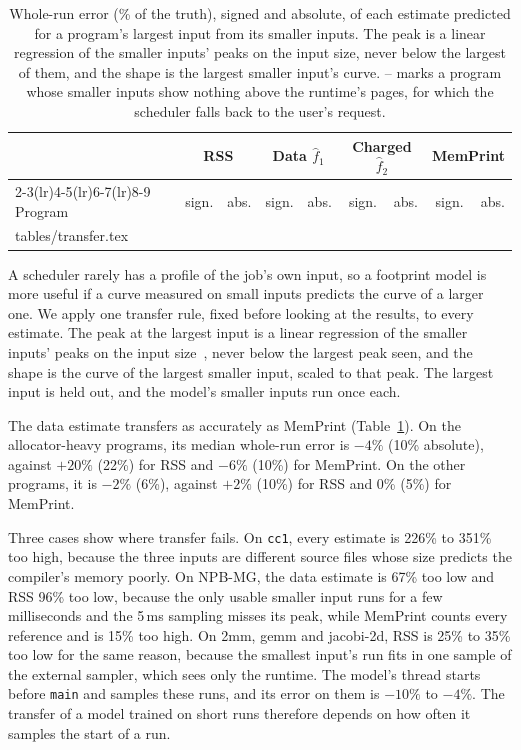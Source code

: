 \documentclass[11pt]{article}
\makeatletter
\newcommand{\memprint}{MemPrint}
\newcommand{\tabref}[1]{Table~\ref{#1}}
\newcommand{\tabinput}[1]{\@@input #1 }   %
\makeatother
\begin{document}
\begin{table}[t]
\centering
\small
\caption{Whole-run error (\% of the truth), signed and absolute, of each estimate predicted for a program's largest
input from its smaller inputs. The peak is a linear regression of the smaller inputs' peaks on the input size, never
below the largest of them, and the shape is the largest smaller input's curve. -- marks a program whose smaller inputs
show nothing above the runtime's pages, for which the scheduler falls back to the user's request.}
\label{tab:transfer}
\setlength{\tabcolsep}{5pt}
\begin{tabular}{lrrrrrrrr}
\toprule
 & \multicolumn{2}{c}{RSS} & \multicolumn{2}{c}{Data $\hat f_1$} & \multicolumn{2}{c}{Charged $\hat f_2$} & \multicolumn{2}{c}{\memprint{}} \\
\cmidrule(lr){2-3}\cmidrule(lr){4-5}\cmidrule(lr){6-7}\cmidrule(lr){8-9}
Program & sign. & abs. & sign. & abs. & sign. & abs. & sign. & abs. \\
\midrule
\tabinput{tables/transfer.tex}
\bottomrule
\end{tabular}
\end{table}

A scheduler rarely has a profile of the job's own input, so a footprint model is more useful if a curve measured on
small inputs predicts the curve of a larger one. We apply one transfer rule, fixed before looking at the results, to
every estimate. The peak at the largest input is a linear regression of the smaller inputs' peaks on the input
size~\cite{KSplus2024}, never below the largest peak seen, and the shape is the curve of the largest smaller input,
scaled to that peak. The largest input is held out, and the model's smaller inputs run once each.

The data estimate transfers as accurately as \memprint{} (\tabref{tab:transfer}). On the allocator-heavy programs, its
median whole-run error is $-4\%$ (10\% absolute), against $+20\%$ (22\%) for RSS and $-6\%$ (10\%) for \memprint{}. On
the other programs, it is $-2\%$ (6\%), against $+2\%$ (10\%) for RSS and 0\% (5\%) for \memprint{}.

Three cases show where transfer fails. On \texttt{cc1}, every estimate is 226\% to 351\% too high, because the three
inputs are different source files whose size predicts the compiler's memory poorly. On NPB-MG, the data estimate is
67\% too low and RSS 96\% too low, because the only usable smaller input runs for a few milliseconds and the 5\,ms
sampling misses its peak, while \memprint{} counts every reference and is 15\% too high. On 2mm, gemm and jacobi-2d,
RSS is 25\% to 35\% too low for the same reason, because the smallest input's run fits in one sample of the external
sampler, which sees only the runtime. The model's thread starts before \texttt{main} and samples these runs, and its
error on them is $-10\%$ to $-4\%$. The transfer of a model trained on short runs therefore depends on how often it
samples the start of a run.
\end{document}
